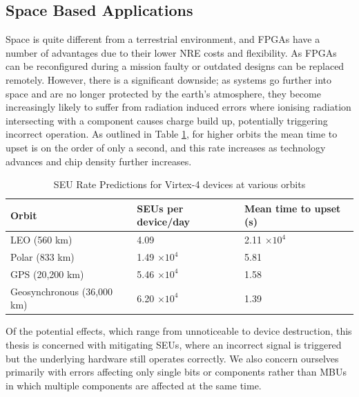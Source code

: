 \documentclass[12pt,final,oneside]{memoir} %
\begin{document}
\subsection{Space Based Applications}
Space is quite different from a terrestrial environment, and \acp{FPGA} have a number of advantages due to their lower \ac{NRE} costs and flexibility. As \acp{FPGA} can be reconfigured during a mission faulty or outdated designs can be replaced remotely. However, there is a significant downside; as systems go further into space and are no longer protected by the earth's atmosphere, they become increasingly likely to suffer from radiation induced errors where ionising radiation intersecting with a component causes charge build up, potentially triggering incorrect operation\cite{SEEMechanism}. As outlined in Table \ref{SEURate}, for higher orbits the mean time to upset is on the order of only a second, and this rate increases as technology advances and chip density further increases.
\begin{table}
    \begin{center}
        \begin{tabular}{lll}
        \toprule
        Orbit & SEUs per device/day &Mean time to upset (s)\\
        \midrule
        LEO (560 km) & 4.09 & 2.11 $\times 10^4$\\
        Polar (833 km) & 1.49 $\times 10^4$ & 5.81\\
        GPS (20,200 km) & 5.46 $\times 10^4$ & 1.58\\
        Geosynchronous (36,000 km) & 6.20 $\times 10^4$ & 1.39\\
        \bottomrule
        \end{tabular}
        \caption{SEU Rate Predictions for Virtex-4 devices at various orbits\cite{DiesselChange}}
        \label{SEURate}
    \end{center}
\end{table}
Of the potential effects, which range from unnoticeable to device destruction, this thesis is concerned with mitigating \acp{SEU}, where an incorrect signal is triggered but the underlying hardware still operates correctly. We also concern ourselves primarily with errors affecting only single bits or components rather than \acp{MBU} in which multiple components are affected at the same time.
\end{document}
